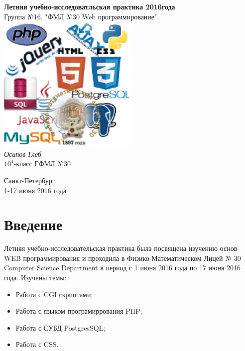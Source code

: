 \documentclass[a4paper]{article}
\begin{document}
\begin{titlepage}
\center \Large \textbf{Летняя учебно-исследоватльская практика 2016года}\\
\vspace{2cm}
Группа №16. "ФМЛ №30 Web программирование".\\
\vspace{0.5 cm}
\includegraphics[width=0.5\textwidth]{web_logo.eps}\\
\vspace{0.5 cm}
\textsl{Осипов Глеб}\\
$10^4$-класс ГФМЛ №30

\vspace{7.6 cm}
Санкт-Петербург \\
1-17 июня 2016 года
\end{titlepage}

\section{Введение}
Летняя учебно-исследовательская практика была посвящена изучению основ WEB программирования и проходила в Физико-Математическом Лицей № 30
Computer Science Department в период с 1 июня 2016 года по 17 июня 2016 года.
Изучены темы:
\begin{itemize}
\item Работа с CGI скриптами;
\item Работа с языком програмиррования PHP;
\item Работа с СУБД PostgresSQL;
\item Работа с CSS.
\end{itemize}
\end{document}
